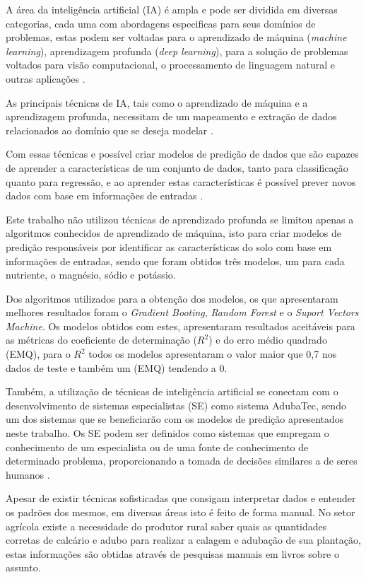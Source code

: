 \documentclass[
12pt,				%
oneside,			%
a4paper,			%
english,			%
french,				%
spanish,			%
brazil				%
]{abntex2}
\begin{document}
A área da inteligência artificial (IA) é ampla e pode ser dividida em diversas categorias, cada uma com abordagens especificas para seus domínios de problemas, estas podem ser voltadas para o aprendizado de máquina (\textit{machine learning}), 
aprendizagem profunda (\textit{deep learning}), para a solução de problemas voltados para visão computacional, o processamento de linguagem natural e outras aplicações \cite{russell2016artificial}. 


As principais técnicas de IA, tais como o aprendizado de máquina e a 
aprendizagem profunda, necessitam de um mapeamento e extração de dados relacionados ao domínio que se deseja modelar \cite{hastie2005elements}. 

Com essas técnicas e possível criar modelos de predição de dados que são capazes de aprender a características de um conjunto de dados, tanto para classificação quanto para regressão, e ao aprender estas características é possível prever novos dados com base em informações de entradas \cite{hastie2005elements}.

Este trabalho não utilizou técnicas de aprendizado profunda se limitou apenas a algoritmos conhecidos de aprendizado de máquina, isto para criar modelos de predição responsáveis por identificar as características do solo com base em informações de entradas, sendo que foram obtidos três modelos, um para cada nutriente, o magnésio, sódio e potássio.

 Dos algoritmos utilizados para a obtenção dos modelos, os que apresentaram melhores resultados foram o \textit{Gradient Booting}, \textit{Random Forest} e o \textit{Suport Vectors Machine}. Os modelos obtidos com estes, apresentaram resultados aceitáveis para as métricas do coeficiente de determinação ($R^2$) e do erro médio quadrado (EMQ), para o $R^2$ todos os modelos apresentaram o valor maior que 0,7 nos dados de teste e também um (EMQ) tendendo a 0.   


Também, a utilização de técnicas de inteligência artificial se conectam com o desenvolvimento de sistemas especialistas (SE) como sistema AdubaTec, sendo um dos sistemas que se beneficiarão com os modelos de predição apresentados neste trabalho. Os SE podem ser definidos como sistemas que empregam o conhecimento de um especialista ou de uma fonte de conhecimento de determinado problema, proporcionando a tomada de decisões similares a de seres humanos \cite{henderson2009encyclopedia}.



Apesar de existir técnicas sofisticadas que consigam interpretar dados e entender os padrões dos mesmos, em diversas áreas isto é feito de forma manual. No setor agrícola existe a necessidade do produtor rural saber quais as quantidades corretas de calcário e adubo para realizar a calagem e adubação de sua plantação, estas informações são obtidas através de pesquisas manuais em livros sobre o assunto.
\end{document}
